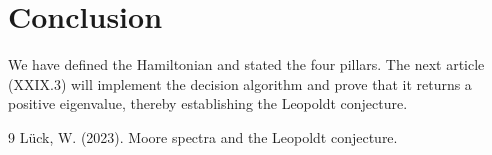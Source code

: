 \documentclass[11pt,a4paper]{article}
\begin{document}
\section{Conclusion}
We have defined the Hamiltonian and stated the four pillars. The next article (XXIX.3) will implement the decision algorithm and prove that it returns a positive eigenvalue, thereby establishing the Leopoldt conjecture.


\begin{thebibliography}{9}
  Lück, W. (2023). Moore spectra and the Leopoldt conjecture.
\end{thebibliography}
\end{document}
